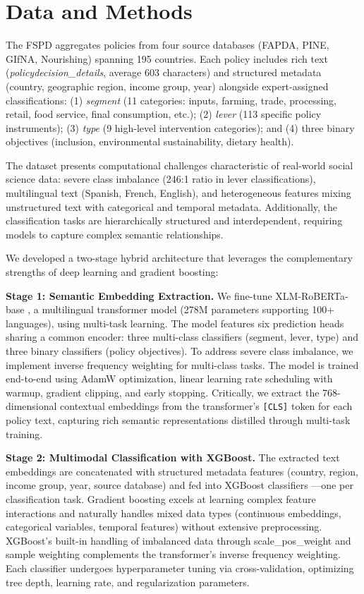\documentclass[a4paper,12pt]{article}
\begin{document}
\section*{Data and Methods}

The FSPD aggregates policies from four source databases (FAPDA, PINE, GIfNA, Nourishing) spanning 195 countries. Each policy includes rich text (\textit{policydecision\_details}, average 603 characters) and structured metadata (country, geographic region, income group, year) alongside expert-assigned classifications: (1) \textit{segment} (11 categories: inputs, farming, trade, processing, retail, food service, final consumption, etc.); (2) \textit{lever} (113 specific policy instruments); (3) \textit{type} (9 high-level intervention categories); and (4) three binary objectives (inclusion, environmental sustainability, dietary health).

The dataset presents computational challenges characteristic of real-world social science data: severe class imbalance (246:1 ratio in lever classifications), multilingual text (Spanish, French, English), and heterogeneous features mixing unstructured text with categorical and temporal metadata. Additionally, the classification tasks are hierarchically structured and interdependent, requiring models to capture complex semantic relationships.

We developed a two-stage hybrid architecture that leverages the complementary strengths of deep learning and gradient boosting:

\textbf{Stage 1: Semantic Embedding Extraction.} We fine-tune XLM-RoBERTa-base \cite{conneau2020}, a multilingual transformer model (278M parameters supporting 100+ languages), using multi-task learning. The model features six prediction heads sharing a common encoder: three multi-class classifiers (segment, lever, type) and three binary classifiers (policy objectives). To address severe class imbalance, we implement inverse frequency weighting for multi-class tasks. The model is trained end-to-end using AdamW optimization, linear learning rate scheduling with warmup, gradient clipping, and early stopping. Critically, we extract the 768-dimensional contextual embeddings from the transformer's \texttt{[CLS]} token for each policy text, capturing rich semantic representations distilled through multi-task training.

\textbf{Stage 2: Multimodal Classification with XGBoost.} The extracted text embeddings are concatenated with structured metadata features (country, region, income group, year, source database) and fed into XGBoost classifiers \cite{chen2016}---one per classification task. Gradient boosting excels at learning complex feature interactions and naturally handles mixed data types (continuous embeddings, categorical variables, temporal features) without extensive preprocessing. XGBoost's built-in handling of imbalanced data through scale\_pos\_weight and sample weighting complements the transformer's inverse frequency weighting. Each classifier undergoes hyperparameter tuning via cross-validation, optimizing tree depth, learning rate, and regularization parameters.
\end{document}
